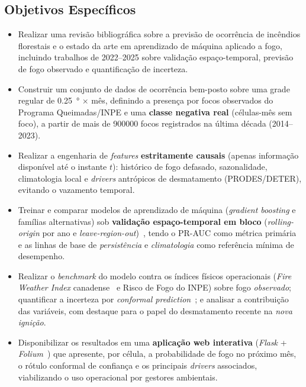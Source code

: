 \documentclass[tcc2]{uftex}
\begin{document}
\subsection{Objetivos Específicos}

\begin{itemize}
    \item[1.] Realizar uma revisão bibliográfica sobre a previsão de ocorrência de incêndios florestais e o estado da arte em aprendizado de máquina aplicado a fogo, incluindo trabalhos de 2022--2025 sobre validação espaço-temporal, previsão de fogo observado e quantificação de incerteza.
    \item[2.] Construir um conjunto de dados de ocorrência bem-posto sobre uma grade regular de \SI{0,25}{\degree} $\times$ mês, definindo a presença por focos observados do Programa Queimadas/INPE e uma \textbf{classe negativa real} (células-mês sem foco), a partir de mais de \num{900000} focos registrados na última década (2014--2023).
    \item[3.] Realizar a engenharia de \emph{features} \textbf{estritamente causais} (apenas informação disponível até o instante \(t\)): histórico de fogo defasado, sazonalidade, climatologia local e \emph{drivers} antrópicos de desmatamento (PRODES/DETER), evitando o vazamento temporal.
    \item[4.] Treinar e comparar modelos de aprendizado de máquina (\emph{gradient boosting} e famílias alternativas) sob \textbf{validação espaço-temporal em bloco} (\emph{rolling-origin} por ano e \emph{leave-region-out})~\cite{roberts2017cv,bergmeir2012cv}, tendo o PR-AUC como métrica primária e as linhas de base de \emph{persistência} e \emph{climatologia} como referência mínima de desempenho.
    \item[5.] Realizar o \emph{benchmark} do modelo contra os índices físicos operacionais (\emph{Fire Weather Index} canadense~\cite{vanwagner1985fwi} e Risco de Fogo do INPE) sobre fogo \emph{observado}; quantificar a incerteza por \emph{conformal prediction}~\cite{sadinle2019lac}; e analisar a contribuição das variáveis, com destaque para o papel do desmatamento recente na \emph{nova ignição}.
    \item[6.] Disponibilizar os resultados em uma \textbf{aplicação web interativa} (\emph{Flask} + \emph{Folium}~\cite{folium,leafletjs}) que apresente, por célula, a probabilidade de fogo no próximo mês, o rótulo conformal de confiança e os principais \emph{drivers} associados, viabilizando o uso operacional por gestores ambientais.
\end{itemize}
\end{document}
